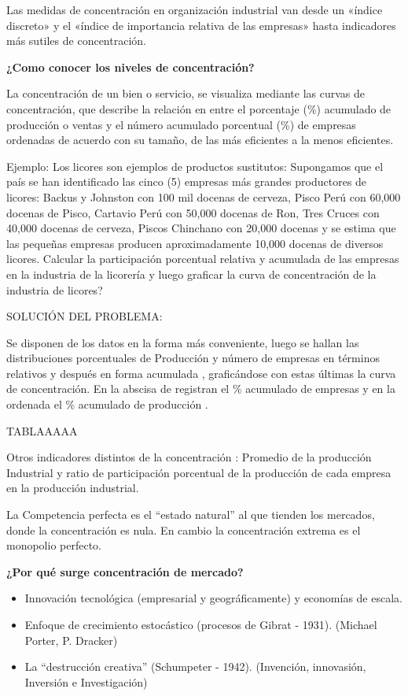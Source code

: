 \documentclass[
  letterpaper,
  DIV=11,
  numbers=noendperiod]{scrartcl}
\begin{document}
Las medidas de concentración en organización industrial van desde un
«índice discreto» y el «índice de importancia relativa de las empresas»
hasta indicadores más sutiles de concentración.

\textbf{¿Como conocer los niveles de concentración?}

La concentración de un bien o servicio, se visualiza mediante las curvas
de concentración, que describe la relación en entre el porcentaje (\%)
acumulado de producción o ventas y el número acumulado porcentual (\%)
de empresas ordenadas de acuerdo con su tamaño, de las más eficientes a
la menos eficientes.

Ejemplo: Los licores son ejemplos de productos sustitutos: Supongamos
que el país se han identificado las cinco (5) empresas más grandes
productores de licores: Backus y Johnston con 100 mil docenas de
cerveza, Pisco Perú con 60,000 docenas de Pisco, Cartavio Perú con
50,000 docenas de Ron, Tres Cruces con 40,000 docenas de cerveza, Piscos
Chinchano con 20,000 docenas y se estima que las pequeñas empresas
producen aproximadamente 10,000 docenas de diversos licores. Calcular la
participación porcentual relativa y acumulada de las empresas en la
industria de la licorería y luego graficar la curva de concentración de
la industria de licores?

SOLUCIÓN DEL PROBLEMA:

Se disponen de los datos en la forma más conveniente, luego se hallan
las distribuciones porcentuales de Producción y número de empresas en
términos relativos y después en forma acumulada , graficándose con estas
últimas la curva de concentración. En la abscisa de registran el \%
acumulado de empresas y en la ordenada el \% acumulado de producción .

TABLAAAAA

Otros indicadores distintos de la concentración : Promedio de la
producción Industrial y ratio de participación porcentual de la
producción de cada empresa en la producción industrial.

La Competencia perfecta es el ``estado natural'' al que tienden los
mercados, donde la concentración es nula. En cambio la concentración
extrema es el monopolio perfecto.

\textbf{¿Por qué surge concentración de mercado?}

\begin{itemize}
\item
  Innovación tecnológica (empresarial y geográficamente) y economías de
  escala.
\item
  Enfoque de crecimiento estocástico (procesos de Gibrat - 1931).
  (Michael Porter, P. Dracker)
\item
  La ``destrucción creativa'' (Schumpeter - 1942). (Invención,
  innovasión, Inversión e Investigación)
\end{itemize}
\end{document}
